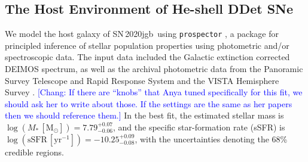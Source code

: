 \documentclass[twocolumn]{aastex631}
\newcommand{\sn}{SN\,2020jgb}
\newcommand{\chang}[1]{\textcolor{blue}{[Chang: #1]}}
\begin{document}
\subsection{The Host Environment of He-shell DDet SNe} \label{sec:host}
We model the host galaxy of \sn\ using \texttt{prospector} \citep{Johnson_prospector_2021}, a package for principled inference of stellar population properties using photometric and/or spectroscopic data. The input data included the Galactic extinction corrected DEIMOS spectrum, as well as the archival photometric data from the Panoramic Survey Telescope and Rapid Response System \citep[Pan-STARRS;][{\it r, i, z} Kron magnitudes]{PS1_2016}  and the VISTA Hemisphere Survey \citep[VHS;][J and $\mathrm{K}_\mathrm{s}$ Petrosian magnitudes]{VHS_2013}. \chang{If there are ``knobs'' that Anya tuned specifically for this fit, we should ask her to write about those. If the settings are the same as her papers then we should reference them.} In the best fit, the estimated stellar mass is $\log (M_*\,[\mathrm{M_\odot}])=7.79_{-0.06}^{+0.07}$, and the specific star-formation rate (sSFR) is $\log (\mathrm{sSFR}\,[\mathrm{yr}^{-1}])=-10.25_{-0.08}^{+0.09}$, with the uncertainties denoting the 68\% credible regions.
\end{document}
